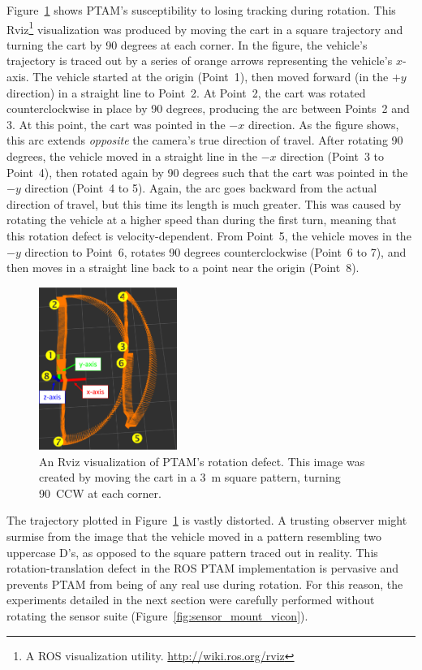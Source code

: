 Figure~\ref{fig:rot_bug_rviz} shows PTAM's susceptibility to losing tracking during rotation. This Rviz\footnote{A ROS visualization utility. \url{http://wiki.ros.org/rviz}} visualization was produced by moving the cart in a square trajectory and turning the cart by 90 degrees at each corner. In the figure, the vehicle's trajectory is traced out by a series of orange arrows representing the vehicle's $x$-axis. The vehicle started at the origin (Point~1), then moved forward (in the $+y$ direction) in a straight line to Point~2. At Point~2, the cart was rotated counterclockwise in place by 90 degrees, producing the arc between Points~2 and 3. At this point, the cart was pointed in the $-x$ direction. As the figure shows, this arc extends \textit{opposite} the camera's true direction of travel. After rotating 90 degrees, the vehicle moved in a straight line in the $-x$ direction (Point~3 to Point~4), then rotated again by 90 degrees such that the cart was pointed in the $-y$ direction (Point~4 to 5). Again, the arc goes backward from the actual direction of travel, but this time its length is much greater. This was caused by rotating the vehicle at a higher speed than during the first turn, meaning that this rotation defect is velocity-dependent. From Point~5, the vehicle moves in the $-y$ direction to Point~6, rotates 90 degrees counterclockwise (Point~6 to 7), and then moves in a straight line back to a point near the origin (Point~8).

\begin{figure}[t]
\centering
    \includegraphics[width=0.4\textwidth]{rot_bug_rviz}
  \caption[Rviz Visualization of Rotational Distortion]{An Rviz visualization of PTAM's rotation defect. This image was created by moving the cart in a 3~m square pattern, turning 90\textdegree\ CCW at each corner.}
  \label{fig:rot_bug_rviz}
\end{figure}

The trajectory plotted in Figure~\ref{fig:rot_bug_rviz} is vastly distorted. A trusting observer might surmise from the image that the vehicle moved in a pattern resembling two uppercase D's, as opposed to the square pattern traced out in reality. This rotation-translation defect in the ROS PTAM implementation is pervasive and prevents PTAM from being of any real use during rotation. For this reason, the experiments detailed in the next section were carefully performed without rotating the sensor suite (Figure~\ref{fig:sensor_mount_vicon}).


